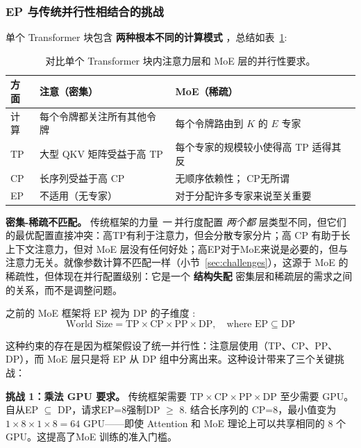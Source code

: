 \documentclass[10pt,logo,copyright]{nvidiatechreport_zh}
\begin{document}
\subsubsection{EP 与传统并行性相结合的挑战}\label{sec:combining-parallelism}

单个 Transformer 块包含 \textbf{两种根本不同的计算模式} \cite{Singh_2023}，总结如表~\ref{tab:dense-sparse-comparison}:

\begin{table}[ht]
\centering
\caption{对比单个 Transformer 块内注意力层和 MoE 层的并行性要求。}
\label{tab:dense-sparse-comparison}
\begin{tabular}{lp{}p{}}
\toprule
\textbf{方面} & \textbf{注意（密集）} & \textbf{MoE（稀疏）} \\
\midrule
计算 & 每个令牌都关注所有其他令牌 & 每个令牌路由到 $K$ 的 $E$ 专家 \\
TP & 大型 QKV 矩阵受益于高 TP & 每个专家的规模较小使得高 TP 适得其反 \\
CP & 长序列受益于高 CP & 无顺序依赖性； CP无所谓 \\
EP & 不适用（无专家） & 对于分配许多专家来说至关重要 \\
\bottomrule
\end{tabular}
\end{table}

\textbf{密集-稀疏不匹配。} 传统框架的力量 \emph{一} 并行度配置 \emph{两个都} 层类型不同，但它们的最优配置直接冲突：高TP有利于注意力，但会分散专家分片；高 CP 有助于长上下文注意力，但对 MoE 层没有任何好处；高EP对于MoE来说是必要的，但与注意力无关。就像参数计算不匹配一样（小节~\ref{sec:challenges}），这源于 MoE 的稀疏性，但体现在并行配置级别：它是一个 \textbf{结构失配} 密集层和稀疏层的需求之间的关系，而不是调整问题。

之前的 MoE 框架将 EP 视为 DP 的子维度 \cite{lepikhin2020gshard,fedus2022switchtransformersscalingtrillion}:
\[
\text{World Size} = \text{TP} \times \text{CP} \times \text{PP} \times \text{DP}, \quad \text{where } \text{EP} \subseteq \text{DP}
\]

这种约束的存在是因为框架假设了统一并行性：注意层使用（TP、CP、PP、DP），而 MoE 层只是将 EP 从 DP 组中分离出来。这种设计带来了三个关键挑战：

\textbf{挑战 1：乘法 GPU 要求。} 传统框架需要 $\text{TP} \times \text{CP} \times \text{PP} \times \text{DP}$ 至少需要 GPU。自从EP $\subseteq$ DP，请求EP=8强制DP $\geq$ 8. 结合长序列的 CP=8，最小值变为 $1 \times 8 \times 1 \times 8 = 64$ GPU——即使 Attention 和 MoE 理论上可以共享相同的 8 个 GPU。这提高了MoE 训练的准入门槛。
\end{document}
